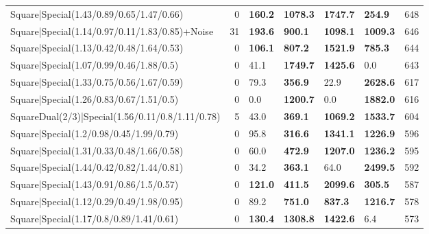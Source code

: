 \begin{tabular}{lrllllr}
 Square|Special(1.43/0.89/0.65/1.47/0.66)                      &             0   & \textbf{160.2} & \textbf{1078.3} & \textbf{1747.7} & \textbf{254.9}  &          648 \\
 Square|Special(1.14/0.97/0.11/1.83/0.85)+Noise                &            31   & \textbf{193.6} & \textbf{900.1}  & \textbf{1098.1} & \textbf{1009.3} &          646 \\
 Square|Special(1.13/0.42/0.48/1.64/0.53)                      &             0   & \textbf{106.1} & \textbf{807.2}  & \textbf{1521.9} & \textbf{785.3}  &          644 \\
 Square|Special(1.07/0.99/0.46/1.88/0.5)                       &             0   & 41.1           & \textbf{1749.7} & \textbf{1425.6} & 0.0             &          643 \\
 Square|Special(1.33/0.75/0.56/1.67/0.59)                      &             0   & 79.3           & \textbf{356.9}  & 22.9            & \textbf{2628.6} &          617 \\
 Square|Special(1.26/0.83/0.67/1.51/0.5)                       &             0   & 0.0            & \textbf{1200.7} & 0.0             & \textbf{1882.0} &          616 \\
 SquareDual(2/3)|Special(1.56/0.11/0.8/1.11/0.78)              &             5   & 43.0           & \textbf{369.1}  & \textbf{1069.2} & \textbf{1533.7} &          604 \\
 Square|Special(1.2/0.98/0.45/1.99/0.79)                       &             0   & 95.8           & \textbf{316.6}  & \textbf{1341.1} & \textbf{1226.9} &          596 \\
 Square|Special(1.31/0.33/0.48/1.66/0.58)                      &             0   & 60.0           & \textbf{472.9}  & \textbf{1207.0} & \textbf{1236.2} &          595 \\
 Square|Special(1.44/0.42/0.82/1.44/0.81)                      &             0   & 34.2           & \textbf{363.1}  & 64.0            & \textbf{2499.5} &          592 \\
 Square|Special(1.43/0.91/0.86/1.5/0.57)                       &             0   & \textbf{121.0} & \textbf{411.5}  & \textbf{2099.6} & \textbf{305.5}  &          587 \\
 Square|Special(1.12/0.29/0.49/1.98/0.95)                      &             0   & 89.2           & \textbf{751.0}  & \textbf{837.3}  & \textbf{1216.7} &          578 \\
 Square|Special(1.17/0.8/0.89/1.41/0.61)                       &             0   & \textbf{130.4} & \textbf{1308.8} & \textbf{1422.6} & 6.4             &          573 \\

\end{tabular}
